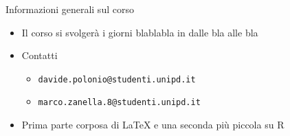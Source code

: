 \begin{frame}{Informazioni generali sul corso}
	\begin{itemize}
		\item Il corso si svolgerà i giorni blablabla in dalle bla alle bla
		\item Contatti
		\begin{itemize}
			\item \texttt{davide.polonio@studenti.unipd.it}
			\item \texttt{marco.zanella.8@studenti.unipd.it}
		\end{itemize}
		\item Prima parte corposa di \LaTeX{} e una seconda più piccola su R
	\end{itemize}
\end{frame}